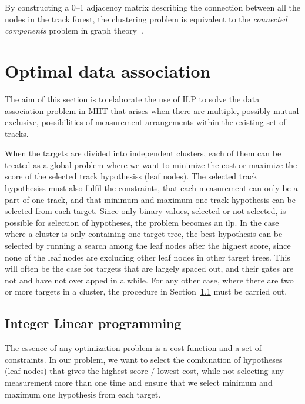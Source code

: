 By constructing a 0--1 adjacency matrix describing the connection between all the nodes in the \gls{track forest}, the clustering problem is equivalent to the \emph{connected components} problem in graph theory~\cite{Chen2015}.

\section{Optimal data association}\label{sec:optim_data_association}
The aim of this section is to elaborate the use of ILP to solve the data association problem in MHT that arises when there are multiple, possibly mutual exclusive, possibilities of measurement arrangements within the existing set of tracks.

When the targets are divided into independent clusters, each of them can be treated as a global problem where we want to minimize the cost or maximize the score of the selected \glspl{track hypothesis} (leaf nodes). The selected \glspl{track hypothesis} must also fulfil the constraints, that each measurement can only be a part of one track, and that minimum and maximum one track hypothesis can be selected from each target. Since only binary values, selected or not selected, is possible for selection of hypotheses, the problem becomes an \gls{ilp}. In the case where a cluster is only containing one target tree, the best hypothesis can be selected by running a search among the leaf nodes after the highest score, since none of the leaf nodes are excluding other leaf nodes in other target trees. This will often be the case for targets that are largely spaced out, and their gates are not and have not overlapped in a while. For any other case, where there are two or more targets in a cluster, the procedure in Section~\ref{subsec:integer_linear_programming} must be carried out.

\subsection{Integer Linear programming}\label{subsec:integer_linear_programming}
The essence of any optimization problem is a cost function and a set of constraints. In our problem, we want to select the combination of hypotheses (leaf nodes) that gives the highest score / lowest cost, while not selecting any measurement more than one time and ensure that we select minimum and maximum one hypothesis from each target. 

